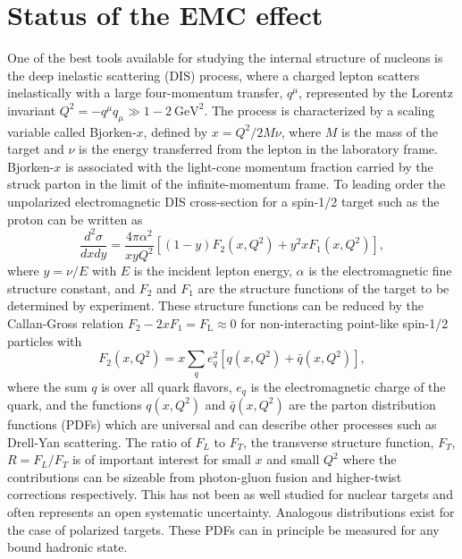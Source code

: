 \section{Status of the EMC effect\label{sec:status}}
%
One of the best tools available for studying the internal structure of nucleons is the deep inelastic
scattering (DIS) process, where a charged lepton scatters inelastically with a large four-momentum
transfer, $q^\mu$, represented by the Lorentz invariant $Q^2 = -q^\mu q_\mu \gg 1-2~\mathrm{GeV}^2$.
The process is characterized by a scaling variable called Bjorken-$x$, defined by $x = Q^2/2M \nu$, 
where $M$ is the mass of the target and $\nu$ is the energy transferred from the lepton in the laboratory frame. Bjorken-$x$ is associated with the light-cone momentum fraction carried by the struck parton in the limit of the infinite-momentum frame. To leading order the unpolarized electromagnetic DIS cross-section for a spin-1/2 target such as the proton can be written as~\cite{PhysRevD.98.030001}
%
\begin{equation}
\frac{d^2 \sigma}{dx dy} = \frac{4 \pi \alpha^2}{x y Q^2} \left[ (1-y)F_2(x, Q^2) + y^2 x F_1(x, Q^2) \right],
\end{equation}
%
where $y = \nu/E$ with $E$ is the incident lepton energy, $\alpha$ is the electromagnetic fine structure constant, and $F_2$
and $F_1$ are the structure functions of the target to be determined by experiment. These structure functions can be reduced by the Callan-Gross relation $F_2 - 2xF_1 = F_\mathrm{L} \approx 0$ for non-interacting point-like spin-1/2 particles with
%
\begin{equation}
F_2(x,Q^2) = x \sum_{q} e_q^2 \left[q(x,Q^2) + \bar{q}(x,Q^2)\right],
\end{equation}
%
where the sum $q$ is over all quark flavors,  $e_q$ is the electromagnetic charge of the quark, and the functions $q(x,Q^2)$ and $\bar{q}(x,Q^2)$ are the parton distribution functions (PDFs) which are universal and can describe other processes such as Drell-Yan scattering.  The ratio of $F_L$ to $F_T$, the transverse structure function, $F_T$,  $R = F_L/F_T$ is of important interest for small $x$ and small $Q^2$ where the contributions can be sizeable from photon-gluon fusion and higher-twist corrections respectively.  This has not been as well studied for nuclear targets and often represents an open systematic uncertainty.  Analogous distributions exist for the case of polarized targets. These PDFs can in principle be measured for any bound hadronic state.

